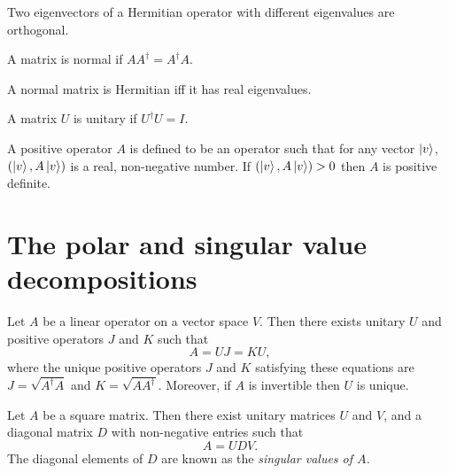 \documentclass{article}
\begin{document}
\begin{theorem}
  Two eigenvectors of a Hermitian operator with different eigenvalues are orthogonal.
\end{theorem}

\begin{definition}
  A matrix is normal if $AA^\dagger=A^\dagger A$.
\end{definition}

\begin{theorem}
  A normal matrix is Hermitian iff it has real eigenvalues.
\end{theorem}

\begin{definition}[Unitary]
  A matrix $U$ is unitary if $U^\dagger U=I$.
\end{definition}

\begin{definition}
  A positive operator $A$ is defined to be an operator
  such that for any vector $\ket{v}$, $(\ket{v},A\ket{v})$
  is a real, non-negative number. If $(\ket{v}, A\ket{v})>0$
  then $A$ is positive definite.
\end{definition}

\section{The polar and singular value decompositions}

\begin{theorem}
  Let $A$ be a linear operator on a vector space $V$. Then
  there exists unitary $U$ and positive operators $J$ and $K$
  such that
  \[A=UJ=KU,\]
  where the unique positive operators $J$ and $K$ satisfying
  these equations are $J=\sqrt{A^\dagger A}$ and $K=\sqrt{AA^\dagger}$.
  Moreover, if $A$ is invertible then $U$ is unique.
\end{theorem}

\begin{theorem}
  Let $A$ be a square matrix. Then there exist unitary matrices
  $U$ and $V$, and a diagonal matrix $D$ with non-negative entries
  such that
  \[A=UDV.\]
  The diagonal elements of $D$ are known as the
  \it{singular values} of $A$.
\end{theorem}
\end{document}
